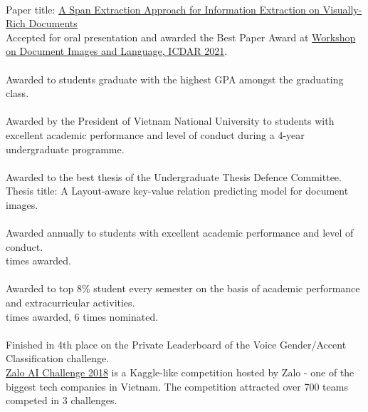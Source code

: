 \\
Paper title: \href{https://aps.arxiv.org/abs/2106.00978}{A Span Extraction Approach for Information Extraction on Visually-Rich Documents}\\
\indent Accepted for oral presentation and awarded the Best Paper Award at \href{https://dil2021.github.io/index.html}{Workshop on Document Images and Language, ICDAR 2021}.\\

\\
Awarded to students graduate with the highest GPA amongst the graduating class.\\

\\
Awarded by the President of Vietnam National University to students with excellent academic performance and level of conduct during a 4-year undergraduate programme.\\

\\
Awarded to the best thesis of the Undergraduate Thesis Defence Committee.\\
\indent Thesis title: A Layout-aware key-value relation predicting model for document images.\\

\\
Awarded annually to students with excellent academic performance and level of conduct.\\
 times awarded.\\

\\
Awarded to top 8\% student every semester on the basis of academic performance and extracurricular activities.\\
 times awarded, 6 times nominated.\\

\\
Finished in 4th place on the Private Leaderboard of the Voice Gender/Accent Classification challenge.\\
\indent \href{https://challenge.zalo.ai}{Zalo AI Challenge 2018} is a Kaggle-like competition hosted by Zalo - one of the biggest tech companies in Vietnam. The competition attracted over 700 teams competed in 3 challenges.\\

